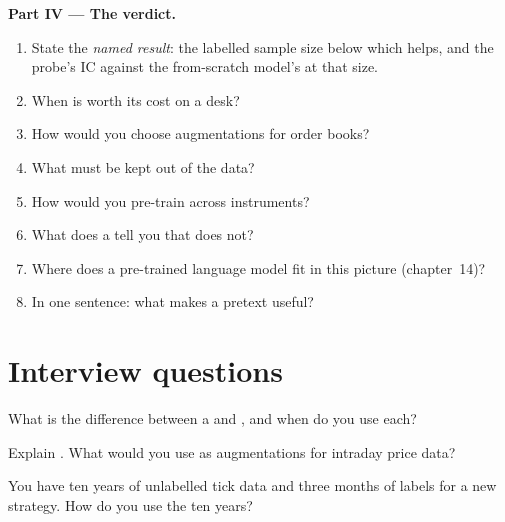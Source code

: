 \begin{problem}
\medskip\noindent\textbf{Part IV --- The verdict.}
\begin{enumerate}[resume]
\item State the \emph{named result}: the labelled sample size below which  helps, and the probe's IC against the
from-scratch model's at that size.
\item When is  worth its cost on a desk?
\item How would you choose augmentations for order books?
\item What must be kept out of the  data?
\item How would you pre-train across instruments?
\item What does a  tell you that  does not?
\item Where does a pre-trained language model fit in this picture (chapter~14)?
\item In one sentence: what makes a pretext useful?
\end{enumerate}
\end{problem}

\section{Interview questions}

\begin{interviewq}\label{iq:ml:representation-learning:1}
What is the difference between a  and , and when do you use each?
\end{interviewq}

\begin{interviewq}\label{iq:ml:representation-learning:2}
Explain . What would you use as augmentations for intraday price data?
\end{interviewq}

\begin{interviewq}\label{iq:ml:representation-learning:3}
You have ten years of unlabelled tick data and three months of labels for a new strategy. How do you use the ten years?
\end{interviewq}

